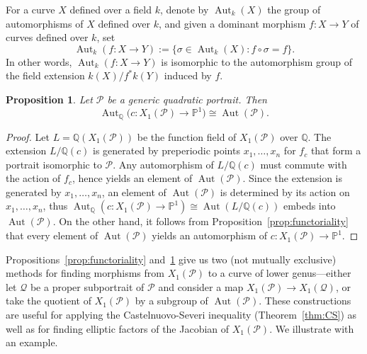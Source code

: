 \documentclass[12pt]{amsart}
\newtheorem{prop}[thm]{Proposition}
\theoremstyle{definition}
\newcommand{\bbP}{\mathbb{P}}
\newcommand{\bbQ}{\mathbb{Q}}
\newcommand{\calP}{\mathcal{P}}
\newcommand{\calQ}{\mathcal{Q}}
\newcommand{\Aut}{\operatorname{Aut}}
\numberwithin{equation}{section}
\begin{document}
For a curve $X$ defined over a field $k$, denote by $\Aut_k(X)$ the group of automorphisms of $X$ defined over $k$, and given a dominant morphism $f : X \to Y$ of curves defined over $k$, set
    \[
        \Aut_k(f : X \to Y) := \{\sigma \in \Aut_k(X) : f\circ\sigma = f\}.
    \]
In other words, $\Aut_k(f : X \to Y)$ is isomorphic to the automorphism group of the field extension $k(X)/f^*k(Y)$ induced by $f$.

\begin{prop}\label{prop:auts}
    Let $\calP$ be a generic quadratic portrait. Then
        \[
        \Aut_\bbQ\big(c : X_1(\calP) \to \bbP^1\big) \cong \Aut(\calP).
        \]
\end{prop}

\begin{proof}
    Let $L = \bbQ(X_1(\calP))$ be the function field of $X_1(\calP)$ over $\mathbb{Q}$. The extension $L/\bbQ(c)$ is generated by preperiodic points $x_1,\ldots,x_n$ for $f_c$ that form a portrait isomorphic to $\calP$. Any automorphism of $L/\bbQ(c)$ must commute with the action of $f_c$, hence yields an element of $\Aut(\calP)$. Since the extension is generated by $x_1,\ldots,x_n$, an element of $\Aut(\calP)$ is determined by its action on $x_1,\ldots,x_n$, thus $\Aut_\bbQ(c : X_1(\calP) \to \bbP^1) \cong \Aut(L/\bbQ(c))$ embeds into $\Aut(\calP)$. On the other hand, it follows from Proposition~\ref{prop:functoriality} that every element of $\Aut(\calP)$ yields an automorphism of $c : X_1(\calP) \to \bbP^1$.
\end{proof}

Propositions~\ref{prop:functoriality} and~\ref{prop:auts} give us two (not mutually exclusive) methods for finding morphisms from $X_1(\calP)$ to a curve of lower genus---either let $\calQ$ be a proper subportrait of $\calP$ and consider a map $X_1(\calP) \to X_1(\calQ)$, or take the quotient of $X_1(\calP)$ by a subgroup of $\Aut(\calP)$. These constructions are useful for applying the Castelnuovo-Severi inequality (Theorem~\ref{thm:CS}) as well as for finding elliptic factors of the Jacobian of $X_1(\calP)$. We illustrate with an example.
\end{document}
